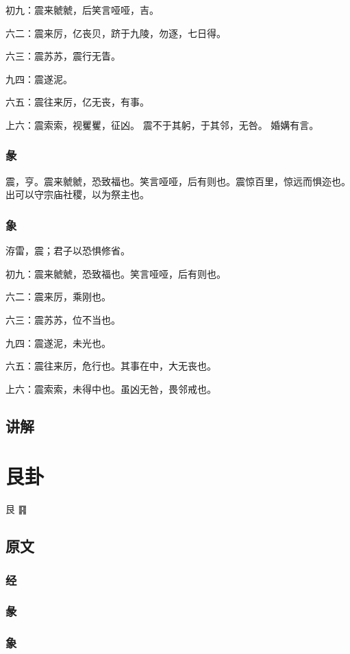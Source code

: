 \documentclass[12pt,oneside]{book}
\begin{document}
初九：震来虩虩，后笑言哑哑，吉。

六二：震来厉，亿丧贝，跻于九陵，勿逐，七日得。

六三：震苏苏，震行无眚。

九四：震遂泥。

六五：震往来厉，亿无丧，有事。

上六：震索索，视矍矍，征凶。 震不于其躬，于其邻，无咎。 婚媾有言。

\subsection{彖}
震，亨。震来虩虩，恐致福也。笑言哑哑，后有则也。震惊百里，惊远而惧迩也。 出可以守宗庙社稷，以为祭主也。

\subsection{象}
洊雷，震；君子以恐惧修省。

初九：震来虩虩，恐致福也。笑言哑哑，后有则也。

六二：震来厉，乘刚也。

六三：震苏苏，位不当也。

九四：震遂泥，未光也。

六五：震往来厉，危行也。其事在中，大无丧也。

上六：震索索，未得中也。虽凶无咎，畏邻戒也。


\section{讲解}




\chapter{艮卦}
艮 {\Large ䷳}
\section{原文}

\subsection{经}

\subsection{彖}

\subsection{象}
\end{document}
